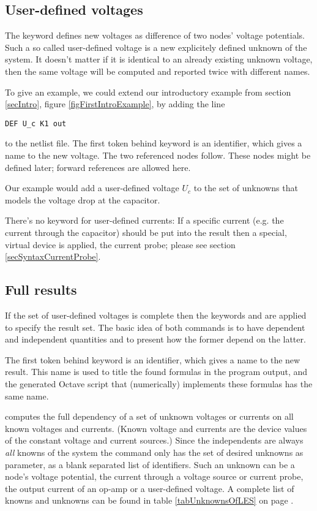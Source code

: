 \subsection{User-defined voltages}
\label{secUserDefVoltage}

The keyword  defines new voltages as difference of two nodes'
voltage potentials. Such a so called user-defined voltage is a new
explicitely defined unknown of the system. It doesn't matter if it is
identical to an already existing unknown voltage, then the same voltage
will be computed and reported twice with different names.

To give an example, we could extend our introductory example from section
\ref{secIntro}, figure \ref{figFirstIntroExample}, by adding the 
line

\begin{verbatim}
DEF U_c K1 out
\end{verbatim}

\noindent
to the netlist file. The first token behind keyword  is an
identifier, which gives a name to the new voltage. The two referenced
nodes follow. These nodes might be defined later; forward references are
allowed here.

Our example would add a user-defined voltage $U_c$ to the set of
unknowns that models the voltage drop at the capacitor.

There's no keyword for user-defined currents: If a specific current (e.g.
the current through the capacitor) should be put into the result then a
special, virtual device is applied, the current probe; please see section
\ref{secSyntaxCurrentProbe}.


\subsection{Full results}

If the set of user-defined voltages is complete then the keywords
 and  are applied to specify the result set. The
basic idea of both commands is to have dependent and independent
quantities and to present how the former depend on the latter.

The first token behind keyword  is an identifier, which gives a
name to the new result. This name is used to title the found formulas in
the program output, and the generated Octave script that (numerically)
implements these formulas has the same name.

 computes the full dependency of a set of unknown voltages or
currents on all known voltages and currents. (Known voltage and currents
are the device values of the constant voltage and current sources.) Since
the independents are always \emph{all} knowns of the system the command
only has the set of desired unknowns as parameter, as a blank separated
list of identifiers. Such an unknown can be a node's voltage potential,
the current through a voltage source or current probe, the output current
of an op-amp or a user-defined voltage. A complete list of knowns and
unknowns can be found in table \ref{tabUnknownsOfLES} on page
\pageref{tabUnknownsOfLES}.

